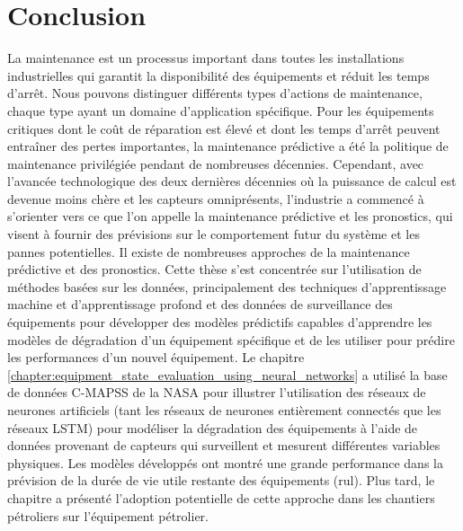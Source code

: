 \chapter*{Conclusion}
La maintenance est un processus important dans toutes les installations industrielles qui garantit la disponibilité des équipements et réduit les temps d'arrêt. Nous pouvons distinguer différents types d'actions de maintenance, chaque type ayant un domaine d'application spécifique. Pour les équipements critiques dont le coût de réparation est élevé et dont les temps d'arrêt peuvent entraîner des pertes importantes, la maintenance prédictive a été la politique de maintenance privilégiée pendant de nombreuses décennies. Cependant, avec l'avancée technologique des deux dernières décennies où la puissance de calcul est devenue moins chère et les capteurs omniprésents, l'industrie a commencé à s'orienter vers ce que l'on appelle la maintenance prédictive et les pronostics, qui visent à fournir des prévisions sur le comportement futur du système et les pannes potentielles. Il existe de nombreuses approches de la maintenance prédictive et des pronostics. Cette thèse s'est concentrée sur l'utilisation de méthodes basées sur les données, principalement des techniques d'apprentissage machine et d'apprentissage profond et des données de surveillance des équipements pour développer des modèles prédictifs capables d'apprendre les modèles de dégradation d'un équipement spécifique et de les utiliser pour prédire les performances d'un nouvel équipement. Le chapitre \ref{chapter:equipment_state_evaluation_using_neural_networks} a utilisé la base de données C-MAPSS de la NASA pour illustrer l'utilisation des réseaux de neurones artificiels (tant les réseaux de neurones entièrement connectés que les réseaux LSTM) pour modéliser la dégradation des équipements à l'aide de données provenant de capteurs qui surveillent et mesurent différentes variables physiques. Les modèles développés ont montré une grande performance dans la prévision de la durée de vie utile restante des équipements (\acrshort{rul}). Plus tard, le chapitre a présenté l'adoption potentielle de cette approche dans les chantiers pétroliers sur l'équipement pétrolier.

